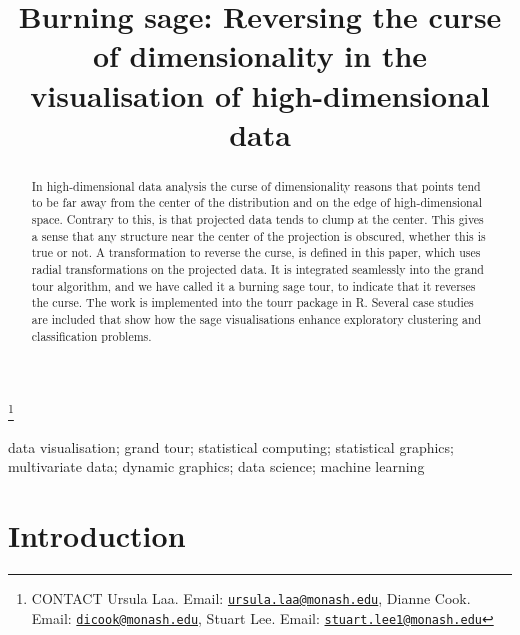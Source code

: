 \documentclass[]{interact}
\theoremstyle{plain}%
\theoremstyle{definition}
\theoremstyle{remark}
\begin{document}

\title{Burning sage: Reversing the curse of dimensionality in the visualisation
of high-dimensional data}


\author{
}

\thanks{CONTACT Ursula Laa. Email: \href{mailto:ursula.laa@monash.edu}{\nolinkurl{ursula.laa@monash.edu}}, Dianne Cook. Email: \href{mailto:dicook@monash.edu}{\nolinkurl{dicook@monash.edu}}, Stuart Lee. Email: \href{mailto:stuart.lee1@monash.edu}{\nolinkurl{stuart.lee1@monash.edu}}}

\maketitle

\begin{abstract}
In high-dimensional data analysis the curse of dimensionality reasons
that points tend to be far away from the center of the distribution and
on the edge of high-dimensional space. Contrary to this, is that
projected data tends to clump at the center. This gives a sense that any
structure near the center of the projection is obscured, whether this is
true or not. A transformation to reverse the curse, is defined in this
paper, which uses radial transformations on the projected data. It is
integrated seamlessly into the grand tour algorithm, and we have called
it a burning sage tour, to indicate that it reverses the curse. The work
is implemented into the tourr package in R. Several case studies are
included that show how the sage visualisations enhance exploratory
clustering and classification problems.
\end{abstract}

\begin{keywords}
data visualisation; grand tour; statistical computing; statistical
graphics; multivariate data; dynamic graphics; data science; machine
learning
\end{keywords}

\doublespacing

\hypertarget{introduction}{%
\section{Introduction}\label{introduction}}
\end{document}
